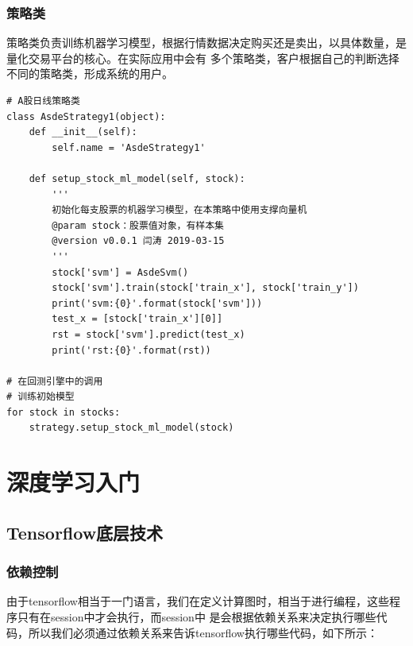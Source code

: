 \documentclass{article}
\begin{document}
\subsubsection{策略类}
策略类负责训练机器学习模型，根据行情数据决定购买还是卖出，以具体数量，是量化交易平台的核心。在实际应用中会有
多个策略类，客户根据自己的判断选择不同的策略类，形成系统的用户。\newline
{}
\begin{lstlisting}
# A股日线策略类
class AsdeStrategy1(object):
    def __init__(self):
        self.name = 'AsdeStrategy1'

    def setup_stock_ml_model(self, stock):
        '''
        初始化每支股票的机器学习模型，在本策略中使用支撑向量机
        @param stock：股票值对象，有样本集
        @version v0.0.1 闫涛 2019-03-15
        '''
        stock['svm'] = AsdeSvm()
        stock['svm'].train(stock['train_x'], stock['train_y'])
        print('svm:{0}'.format(stock['svm']))
        test_x = [stock['train_x'][0]]
        rst = stock['svm'].predict(test_x)
        print('rst:{0}'.format(rst))

# 在回测引擎中的调用
# 训练初始模型
for stock in stocks:
    strategy.setup_stock_ml_model(stock)
\end{lstlisting}


















\section{深度学习入门}
\subsection{Tensorflow底层技术}
\subsubsection{依赖控制}
由于tensorflow相当于一门语言，我们在定义计算图时，相当于进行编程，这些程序只有在session中才会执行，而session中
是会根据依赖关系来决定执行哪些代码，所以我们必须通过依赖关系来告诉tensorflow执行哪些代码，如下所示：
\end{document}
